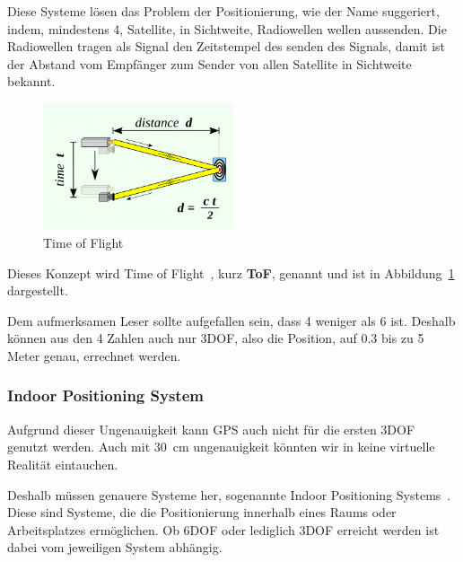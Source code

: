 Diese Systeme lösen das Problem der Positionierung, wie der Name suggeriert, indem, mindestens 4, Satellite, in Sichtweite, Radiowellen wellen aussenden.
Die Radiowellen tragen als Signal den Zeitstempel des senden des Signals, damit ist der Abstand vom Empfänger zum Sender von allen Satellite in Sichtweite bekannt.
\begin{figure}[ht!]
    \label{fig:ToF}
    \center
    \includegraphics[width={0.5\textwidth}]{../assets/img/time_of_flight}
    \caption{Time of Flight~\autocite{wikipedia-contributors-2023D}}
\end{figure}
Dieses Konzept wird Time of Flight~\autocite{wikipedia-contributors-2023D}, kurz \textbf{ToF}, genannt und ist in Abbildung~\ref{fig:ToF} dargestellt.

Dem aufmerksamen Leser sollte aufgefallen sein, dass 4 weniger als 6 ist.
Deshalb können aus den 4 Zahlen auch nur 3DOF, also die Position, auf 0.3 bis zu 5 Meter genau, errechnet werden.

\subsubsection{Indoor Positioning System}\label{subsubsec:indoor-positioning-system}
Aufgrund dieser Ungenauigkeit kann GPS auch nicht für die ersten 3DOF genutzt werden.
Auch mit 30~cm ungenauigkeit könnten wir in keine virtuelle Realität eintauchen.

Deshalb müssen genauere Systeme her, sogenannte Indoor Positioning Systems~\autocite{wikipedia-contributors-2023E}.
Diese sind Systeme, die die Positionierung innerhalb eines Raums oder Arbeitsplatzes ermöglichen.
Ob 6DOF oder lediglich 3DOF erreicht werden ist dabei vom jeweiligen System abhängig.

